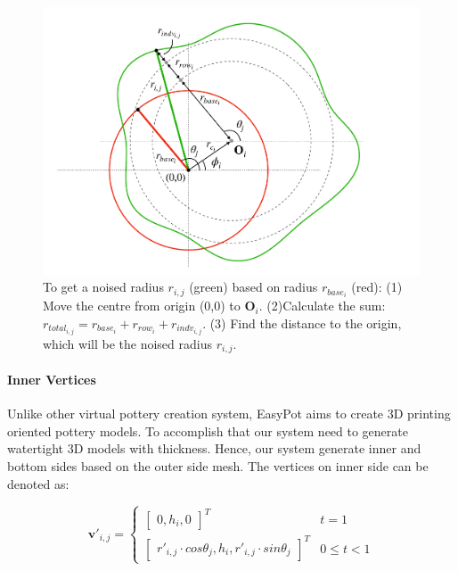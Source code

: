 \documentclass{svjour3}                     %
\begin{document}
\begin{figure}
\includegraphics[width=\textwidth]{fig4.pdf}
\caption{To get a noised radius $r_{i,j}$ (green) based on radius $r_{base_{i}}$ (red): (1) Move the centre from origin (0,0) to $\mathbf{O}_{i}$. (2)Calculate the sum: $r_{total_{i,j}} = r_{base_{i}} + r_{row_{i}} + r_{indv_{i,j}}$. (3) Find the distance to the origin, which will be the noised radius $r_{i,j}$.}
\label{fig:noise}
\end{figure}

\paragraph{Inner Vertices} Unlike other virtual pottery creation system, EasyPot aims to create 3D printing oriented pottery models. To accomplish that our system need to generate watertight 3D models with thickness. Hence, our system generate inner and bottom sides based on the outer side mesh. The vertices on inner side can be denoted as:


\begin{equation}
\label{eqn:v'}
\mathbf{v'}_{i,j} 
= \begin{cases}
\begin{bmatrix}
0,h_{i},0
\end{bmatrix}^T & t=1
\\
\begin{bmatrix}
r'_{i,j} \cdot cos \theta_{j},
h_{i},
r'_{i,j} \cdot sin \theta_{j}
\end{bmatrix}^T & 0 \le t<1
\end{cases}
\end{equation}
\end{document}
